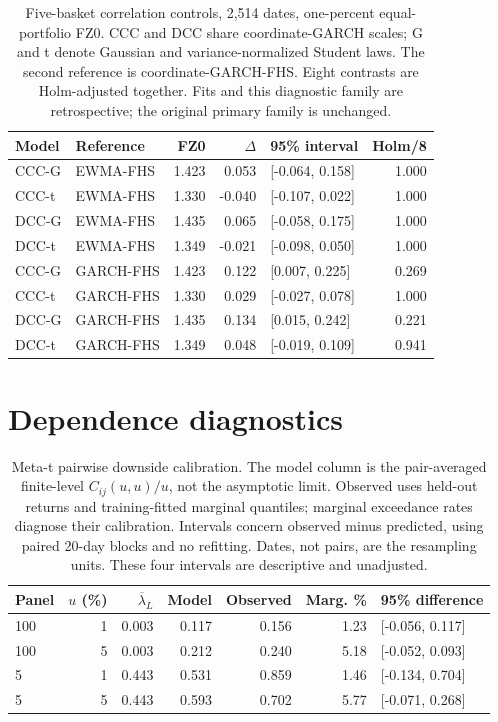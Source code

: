 \documentclass[11pt]{article}
\theoremstyle{definition}\newtheorem{definition}[theorem]{Definition}
\theoremstyle{remark}\newtheorem{remark}[theorem]{Remark}
\begin{document}
\begin{table}[htbp]
\centering\footnotesize
\setlength{\tabcolsep}{4pt}
\begin{tabular}{llrrlr}
\toprule
Model & Reference & FZ0 & $\Delta$ & 95\% interval & Holm/8 \\
\midrule
CCC-G & EWMA-FHS & 1.423 & 0.053 & [-0.064, 0.158] & 1.000 \\
CCC-t & EWMA-FHS & 1.330 & -0.040 & [-0.107, 0.022] & 1.000 \\
DCC-G & EWMA-FHS & 1.435 & 0.065 & [-0.058, 0.175] & 1.000 \\
DCC-t & EWMA-FHS & 1.349 & -0.021 & [-0.098, 0.050] & 1.000 \\
CCC-G & GARCH-FHS & 1.423 & 0.122 & [0.007, 0.225] & 0.269 \\
CCC-t & GARCH-FHS & 1.330 & 0.029 & [-0.027, 0.078] & 1.000 \\
DCC-G & GARCH-FHS & 1.435 & 0.134 & [0.015, 0.242] & 0.221 \\
DCC-t & GARCH-FHS & 1.349 & 0.048 & [-0.019, 0.109] & 0.941 \\
\bottomrule
\end{tabular}
\caption{Five-basket correlation controls, 2,514 dates, one-percent equal-portfolio FZ0. CCC and DCC share coordinate-GARCH scales; G and t denote Gaussian and variance-normalized Student laws. The second reference is coordinate-GARCH-FHS. Eight contrasts are Holm-adjusted together. Fits and this diagnostic family are retrospective; the original primary family is unchanged.}\label{tab:r5-dcc}
\end{table}

\FloatBarrier
\section{Dependence diagnostics}\label{app:dependence}
\begin{table}[htbp]
\centering\footnotesize
\setlength{\tabcolsep}{4pt}
\begin{tabular}{lrrrrrl}
\toprule
Panel & $u$ (\%) & $\overline\lambda_L$ & Model & Observed & Marg. \% & 95\% difference \\
\midrule
100 & 1 & 0.003 & 0.117 & 0.156 & 1.23 & [-0.056, 0.117] \\
100 & 5 & 0.003 & 0.212 & 0.240 & 5.18 & [-0.052, 0.093] \\
5 & 1 & 0.443 & 0.531 & 0.859 & 1.46 & [-0.134, 0.704] \\
5 & 5 & 0.443 & 0.593 & 0.702 & 5.77 & [-0.071, 0.268] \\
\bottomrule
\end{tabular}
\caption{Meta-t pairwise downside calibration. The model column is the pair-averaged finite-level $C_{ij}(u,u)/u$, not the asymptotic limit. Observed uses held-out returns and training-fitted marginal quantiles; marginal exceedance rates diagnose their calibration. Intervals concern observed minus predicted, using paired 20-day blocks and no refitting. Dates, not pairs, are the resampling units. These four intervals are descriptive and unadjusted.}\label{tab:r5-tail}
\end{table}
\end{document}
